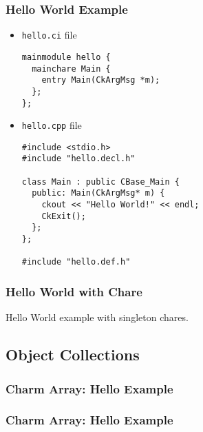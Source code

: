 \begin{frame}[fragile]
   \frametitle{Hello World Example}\scriptsize
\begin{itemize}
\item \texttt{hello.ci} file
   \begin{lstlisting}
mainmodule hello {
  mainchare Main {
    entry Main(CkArgMsg *m);
  };
};
   \end{lstlisting}
\item \texttt{hello.cpp} file
\lstset{basicstyle=\footnotesize}
   \begin{lstlisting}
#include <stdio.h>
#include "hello.decl.h"

class Main : public CBase_Main {
  public: Main(CkArgMsg* m) {
    ckout << "Hello World!" << endl;
    CkExit();
  };
};

#include "hello.def.h"
   \end{lstlisting}
\end{itemize}
\end{frame}

\begin{frame}[fragile]
   \frametitle{Hello World with Chare}\scriptsize
    Hello World example with singleton chares.
\end{frame}


\subsection[Collections]{Object Collections}



\begin{frame}[fragile]
  \frametitle{Charm Array: Hello Example }
  
\end{frame}

\begin{frame}[fragile]
  \frametitle{Charm Array: Hello Example }
  
\end{frame}



